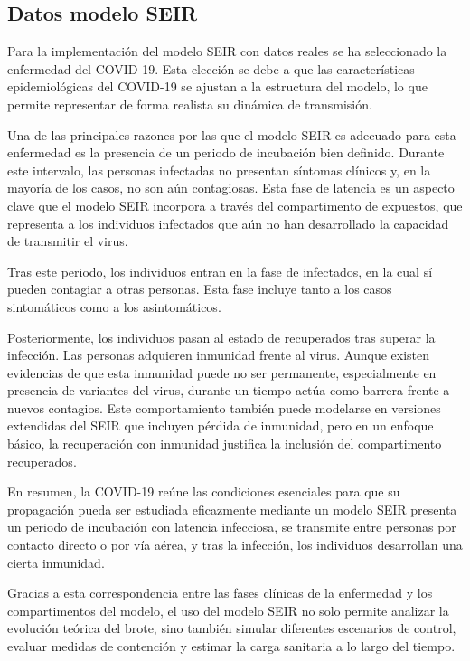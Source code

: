 \subsection{Datos modelo SEIR}
Para la implementación del modelo SEIR con datos reales se ha seleccionado la enfermedad del COVID-19. Esta elección se debe a que las características epidemiológicas del COVID-19 se ajustan a la estructura del modelo, lo que permite representar de forma realista su dinámica de transmisión.

Una de las principales razones por las que el modelo SEIR es adecuado para esta enfermedad es la presencia de un periodo de incubación bien definido. Durante este intervalo, las personas infectadas no presentan síntomas clínicos y, en la mayoría de los casos, no son aún contagiosas. Esta fase de latencia es un aspecto clave que el modelo SEIR incorpora a través del compartimento de expuestos, que representa a los individuos infectados que aún no han desarrollado la capacidad de transmitir el virus.

Tras este periodo, los individuos entran en la fase de infectados, en la cual sí pueden contagiar a otras personas. Esta fase incluye tanto a los casos sintomáticos como a los asintomáticos. 

Posteriormente, los individuos pasan al estado de recuperados tras superar la infección. Las personas adquieren inmunidad frente al virus. Aunque existen evidencias de que esta inmunidad puede no ser permanente, especialmente en presencia de variantes del virus, durante un tiempo actúa como barrera frente a nuevos contagios. Este comportamiento también puede modelarse en versiones extendidas del SEIR que incluyen pérdida de inmunidad, pero en un enfoque básico, la recuperación con inmunidad justifica la inclusión del compartimento recuperados.

En resumen, la COVID-19 reúne las condiciones esenciales para que su propagación pueda ser estudiada eficazmente mediante un modelo SEIR presenta un periodo de incubación con latencia infecciosa, se transmite entre personas por contacto directo o por vía aérea, y tras la infección, los individuos desarrollan una cierta inmunidad.

Gracias a esta correspondencia entre las fases clínicas de la enfermedad y los compartimentos del modelo, el uso del modelo SEIR no solo permite analizar la evolución teórica del brote, sino también simular diferentes escenarios de control, evaluar medidas de contención y estimar la carga sanitaria a lo largo del tiempo. 

